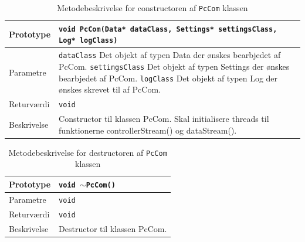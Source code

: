 \begin{table}[h]
\begin{tabularx}{\textwidth}{| L{2.5 cm} | Z |} \hline
Prototype 	& \texttt{void PcCom(Data* dataClass, Settings* settingsClass, Log* logClass)} \\\hline
Parametre 	& \texttt{dataClass} 		\newline Det objekt af typen Data der ønskes bearbjedet af PcCom. \newline \newline
			  \texttt{settingsClass} 	\newline Det objekt af typen Settings der ønskes bearbjedet af PcCom. \newline \newline
			  \texttt{logClass}	 		\newline Det objekt af typen Log der ønskes skrevet til af PcCom. \\\hline
Returværdi	& \texttt{void} 			\newline \\\hline
Beskrivelse	& Constructor til klassen PcCom. Skal initialisere threads til funktionerne controllerStream() og dataStream(). \\\hline
\end{tabularx}
\caption{Metodebeskrivelse for constructoren af \texttt{PcCom} klassen}
\label{table:met_pccom}
\end{table}

\begin{table}[h]
\begin{tabularx}{\textwidth}{| L{2.5 cm} | Z |} \hline
Prototype 	& \texttt{void $\sim$PcCom()} \\\hline
Parametre 	& \texttt{void}				\newline \\\hline
Returværdi	& \texttt{void} 			\newline \\\hline
Beskrivelse	& Destructor til klassen PcCom. \newline \\\hline
\end{tabularx}
\caption{Metodebeskrivelse for destructoren af \texttt{PcCom} klassen}
\label{table:met_pccom_de}
\end{table}

